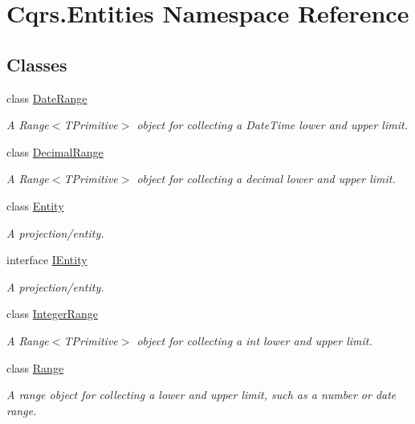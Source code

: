 \hypertarget{namespaceCqrs_1_1Entities}{}\section{Cqrs.\+Entities Namespace Reference}
\label{namespaceCqrs_1_1Entities}
\subsection*{Classes}
\begin{DoxyCompactItemize}
\item 
class \hyperlink{classCqrs_1_1Entities_1_1DateRange}{Date\+Range}
\begin{DoxyCompactList}\small\item\em A Range$<$\+T\+Primitive$>$ object for collecting a Date\+Time lower and upper limit. \end{DoxyCompactList}\item 
class \hyperlink{classCqrs_1_1Entities_1_1DecimalRange}{Decimal\+Range}
\begin{DoxyCompactList}\small\item\em A Range$<$\+T\+Primitive$>$ object for collecting a decimal lower and upper limit. \end{DoxyCompactList}\item 
class \hyperlink{classCqrs_1_1Entities_1_1Entity}{Entity}
\begin{DoxyCompactList}\small\item\em A projection/entity. \end{DoxyCompactList}\item 
interface \hyperlink{interfaceCqrs_1_1Entities_1_1IEntity}{I\+Entity}
\begin{DoxyCompactList}\small\item\em A projection/entity. \end{DoxyCompactList}\item 
class \hyperlink{classCqrs_1_1Entities_1_1IntegerRange}{Integer\+Range}
\begin{DoxyCompactList}\small\item\em A Range$<$\+T\+Primitive$>$ object for collecting a int lower and upper limit. \end{DoxyCompactList}\item 
class \hyperlink{classCqrs_1_1Entities_1_1Range}{Range}
\begin{DoxyCompactList}\small\item\em A range object for collecting a lower and upper limit, such as a number or date range. \end{DoxyCompactList}\end{DoxyCompactItemize}
